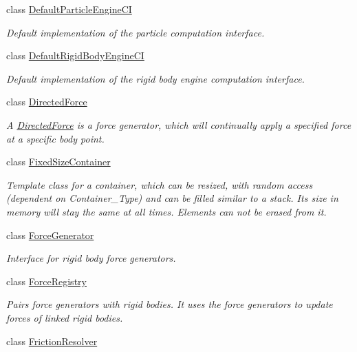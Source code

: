 \begin{DoxyCompactItemize}
class \mbox{\hyperlink{classr3_1_1_default_particle_engine_c_i}{Default\+Particle\+Engine\+CI}}
\begin{DoxyCompactList}\small\item\em Default implementation of the particle computation interface. \end{DoxyCompactList}\item 
class \mbox{\hyperlink{classr3_1_1_default_rigid_body_engine_c_i}{Default\+Rigid\+Body\+Engine\+CI}}
\begin{DoxyCompactList}\small\item\em Default implementation of the rigid body engine computation interface. \end{DoxyCompactList}\item 
class \mbox{\hyperlink{classr3_1_1_directed_force}{Directed\+Force}}
\begin{DoxyCompactList}\small\item\em A \mbox{\hyperlink{classr3_1_1_directed_force}{Directed\+Force}} is a force generator, which will continually apply a specified force at a specific body point. \end{DoxyCompactList}\item 
class \mbox{\hyperlink{classr3_1_1_fixed_size_container}{Fixed\+Size\+Container}}
\begin{DoxyCompactList}\small\item\em Template class for a container, which can be resized, with random access (dependent on Container\+\_\+\+Type) and can be filled similar to a stack. Its size in memory will stay the same at all times. Elements can not be erased from it. \end{DoxyCompactList}\item 
class \mbox{\hyperlink{classr3_1_1_force_generator}{Force\+Generator}}
\begin{DoxyCompactList}\small\item\em Interface for rigid body force generators. \end{DoxyCompactList}\item 
class \mbox{\hyperlink{classr3_1_1_force_registry}{Force\+Registry}}
\begin{DoxyCompactList}\small\item\em Pairs force generators with rigid bodies. It uses the force generators to update forces of linked rigid bodies. \end{DoxyCompactList}\item 
class \mbox{\hyperlink{classr3_1_1_friction_resolver}{Friction\+Resolver}}

\end{DoxyCompactItemize}
